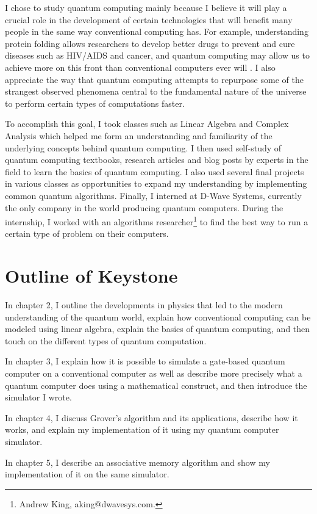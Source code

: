 \documentclass[11pt]{report}
\newcommand{\?}{\stackrel{?}{=}}
\begin{document}
I chose to study quantum computing mainly because I believe it will play a crucial role in the development of certain technologies that will benefit many people in the same way conventional computing has. For example, understanding protein folding allows researchers to develop better drugs to prevent and cure diseases such as HIV/AIDS and cancer, and quantum computing may allow us to achieve more on this front than conventional computers ever will \cite{foldit}. I also appreciate the way that quantum computing attempts to repurpose some of the strangest observed phenomena central to the fundamental nature of the universe to perform certain types of computations faster. 

To accomplish this goal, I took classes such as Linear Algebra and Complex Analysis which helped me form an understanding and familiarity of the underlying concepts behind quantum computing. I then used self-study of quantum computing textbooks, research articles and blog posts by experts in the field to learn the basics of quantum computing. I also used several final projects in various classes as opportunities to expand my understanding by implementing common quantum algorithms. Finally, I interned at D-Wave Systems, currently the only company in the world producing quantum computers. During the internship, I worked with an algorithms researcher\footnote{Andrew King, aking@dwavesys.com.} to find the best way to run a certain type of problem on their computers.

\section{Outline of Keystone}
In chapter 2, I outline the developments in physics that led to the modern understanding of the quantum world, explain how conventional computing can be modeled using linear algebra, explain the basics of quantum computing, and then touch on the different types of quantum computation.

In chapter 3, I explain how it is possible to simulate a gate-based quantum computer on a conventional computer as well as describe more precisely what a quantum computer does using a mathematical construct, and then introduce the simulator I wrote.

In chapter 4, I discuss Grover's algorithm and its applications, describe how it works, and explain my implementation of it using my quantum computer simulator.

In chapter 5, I describe an associative memory algorithm and show my implementation of it on the same simulator.
\end{document}
